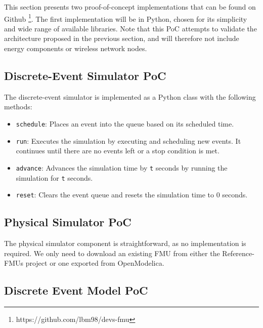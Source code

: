 \documentclass[conference]{IEEEtran}
\begin{document}
This section presents two proof-of-concept implementations that can be found on Github \footnote{https://github.com/lbm98/devs-fmu}. The first implementation will be in Python, chosen for its simplicity and wide range of available libraries.
Note that this PoC attempts to validate the architecture proposed in the previous section,
and will therefore not include energy components or wireless network nodes.

\subsection{Discrete-Event Simulator PoC}

The discrete-event simulator is implemented as a Python class with the following methods:
\begin{itemize}
    \item \texttt{schedule}: Places an event into the queue based on its scheduled time.
    \item \texttt{run}: Executes the simulation by executing and scheduling new events. It continues until there are no events left or a stop condition is met.
    \item \texttt{advance}: Advances the simulation time by \texttt{t} seconds by running the simulation for \texttt{t} seconds.
    \item \texttt{reset}: Clears the event queue and resets the simulation time to 0 seconds.
\end{itemize}

\subsection{Physical Simulator PoC}

The physical simulator component is straightforward, as no implementation is required. We only need to download an existing FMU from either the Reference-FMUs project or one exported from OpenModelica.

\subsection{Discrete Event Model PoC}
\end{document}

